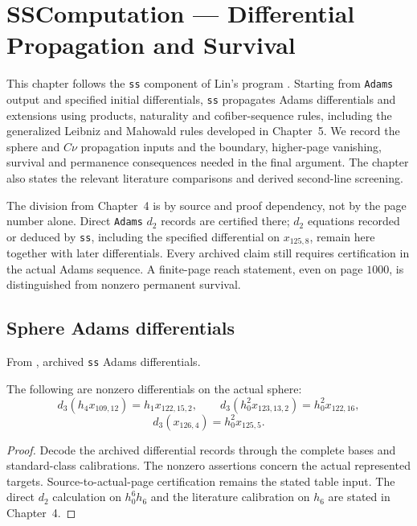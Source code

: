 \chapter{SSComputation --- Differential Propagation and Survival}
This chapter follows the \texttt{ss} component of Lin's program
\cite{LinProgram}. Starting from \texttt{Adams} output and specified
initial differentials, \texttt{ss} propagates Adams differentials and
extensions using products, naturality and cofiber-sequence rules,
including the generalized Leibniz and Mahowald rules developed in
Chapter~5. We record the sphere and $C\nu$ propagation inputs and the
boundary, higher-page vanishing, survival and permanence consequences
needed in the final argument. The chapter also states the relevant
literature comparisons and derived second-line screening.

The division from Chapter~4 is by source and proof dependency, not by
the page number alone. Direct \texttt{Adams} $d_2$ records are certified
there; $d_2$ equations recorded or deduced by \texttt{ss}, including the
specified differential on $x_{125,8}$, remain here together with later
differentials. Every archived claim still requires certification
in the actual Adams sequence. A finite-page reach statement, even on
page $1000$, is distinguished from nonzero permanent survival.

\section{Sphere Adams differentials}


\begin{theorem}
\label{sem:Computation:low-differentials}
From \cite{LinProgram}, archived \texttt{ss} Adams differentials.\par
The following are nonzero differentials on the actual sphere:
\[
d_3(h_4x_{109,12})=h_1x_{122,15,2},\qquad
 d_3(h_0^2x_{123,13,2})=h_0^2x_{122,16},
\]
\[
d_3(x_{126,4})=h_0^2x_{125,5}.
\]
\end{theorem}
\begin{proof}
Decode the archived differential records through the complete bases and
standard-class calibrations. The nonzero assertions concern the actual
represented targets. Source-to-actual-page certification remains the
stated table input. The direct $d_2$ calculation on $h_0^6h_6$ and the
literature calibration on $h_6$ are stated in Chapter~4.
\end{proof}


